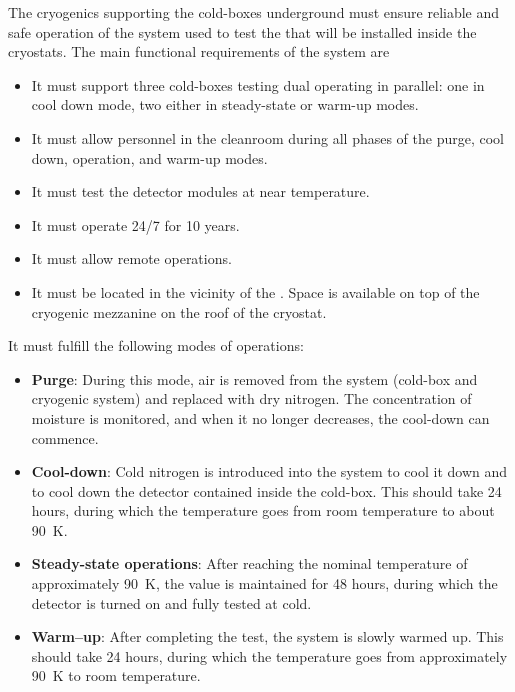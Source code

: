 \label{sec:fdsp-tc-cryocoldbox}

The cryogenics supporting the cold-boxes underground must ensure reliable and safe operation of the system used to test the  that will be installed inside the cryostats. The main functional requirements of the system are
\begin{itemize}
\setlength\itemsep{1mm}
\setlength{\parsep}{1mm}
\setlength{\itemsep}{-5mm}
\item It must support three cold-boxes testing dual  operating in parallel: one in cool down mode, two either in steady-state or warm-up modes.
\item It must allow personnel in the cleanroom during all phases of the purge, cool down, operation, and warm-up modes. 
\item It must test the detector modules at near  temperature.
\item It must operate 24/7 for 10 years.
\item It must allow remote operations.
\item It must be located in the vicinity of the . Space is available on top of the cryogenic mezzanine on the roof of the cryostat.
\end{itemize}

It must fulfill the following modes of operations:

\begin{itemize}
\setlength\itemsep{1mm}
\setlength{\parsep}{1mm}
\setlength{\itemsep}{-5mm}
\item \textbf{Purge}: During this mode, air is removed from the system (cold-box and cryogenic system) and replaced with dry nitrogen. The concentration of moisture is monitored, and when it no longer decreases, the cool-down can commence.
\item \textbf{Cool-down}: Cold nitrogen is introduced into the system to cool it down and to cool down the detector contained inside the cold-box. This should take 24 hours, during which the temperature goes from room temperature to about \SI{90}{K}. 
\item \textbf{Steady-state operations}: After reaching the nominal temperature of approximately \SI{90}{K}, the value is maintained for 48 hours, during which the detector is turned on and fully tested at cold. 
\item \textbf{Warm--up}: After completing the test, the system is slowly warmed up. This should take 24 hours, during which the temperature goes from approximately \SI{90}{K} to room temperature.
\end{itemize}

